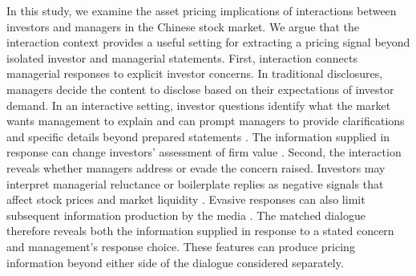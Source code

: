 \documentclass[12pt]{article}
\begin{document}
In this study, we examine the asset pricing implications of interactions between investors and managers in the Chinese stock market. We argue that the interaction context provides a useful setting for extracting a pricing signal beyond isolated investor and managerial statements. First, interaction connects managerial responses to explicit investor concerns. In traditional disclosures, managers decide the content to disclose based on their expectations of investor demand. In an interactive setting, investor questions identify what the market wants management to explain and can prompt managers to provide clarifications and specific details beyond prepared statements \citep{hollander2010,matsumoto2011}. The information supplied in response can change investors' assessment of firm value \citep{matsumoto2011}. Second, the interaction reveals whether managers address or evade the concern raised. Investors may interpret managerial reluctance or boilerplate replies as negative signals that affect stock prices and market liquidity \citep{hollander2010,xie2023}. Evasive responses can also limit subsequent information production by the media \citep{boustanifar2025}. The matched dialogue therefore reveals both the information supplied in response to a stated concern and management's response choice. These features can produce pricing information beyond either side of the dialogue considered separately.
\end{document}
